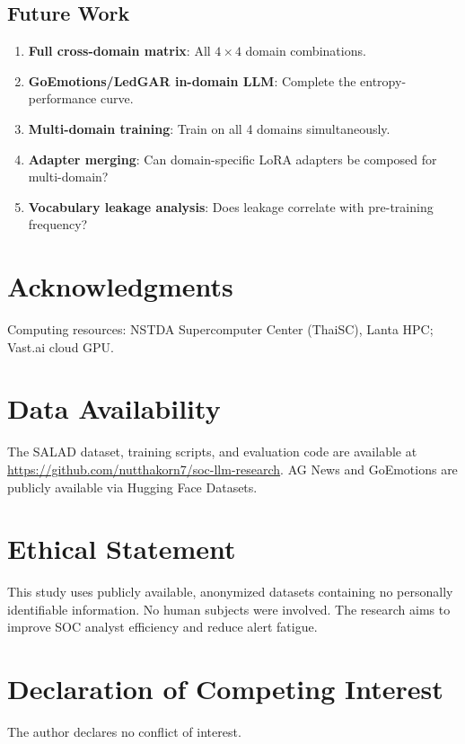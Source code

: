\documentclass[journal]{IEEEtran}
\begin{document}
\subsection{Future Work}
\begin{enumerate}
\item \textbf{Full cross-domain matrix}: All $4 \times 4$ domain combinations.
\item \textbf{GoEmotions/LedGAR in-domain LLM}: Complete the entropy-performance curve.
\item \textbf{Multi-domain training}: Train on all 4 domains simultaneously.
\item \textbf{Adapter merging}: Can domain-specific LoRA adapters be composed for multi-domain?
\item \textbf{Vocabulary leakage analysis}: Does leakage correlate with pre-training frequency?
\end{enumerate}

\section*{Acknowledgments}
Computing resources: NSTDA Supercomputer Center (ThaiSC), Lanta HPC; Vast.ai cloud GPU.


\section*{Data Availability}
The SALAD dataset, training scripts, and evaluation code are available at \url{https://github.com/nutthakorn7/soc-llm-research}. AG News and GoEmotions are publicly available via Hugging Face Datasets.

\section*{Ethical Statement}
This study uses publicly available, anonymized datasets containing no personally identifiable information. No human subjects were involved. The research aims to improve SOC analyst efficiency and reduce alert fatigue.

\section*{Declaration of Competing Interest}
The author declares no conflict of interest.
\end{document}
